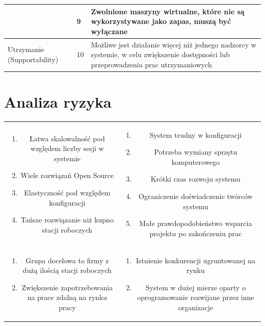 \documentclass[12pt]{article}
\begin{document}
\begin{center}
\begin{table}[h!]
\begin{tabular}{|p{}|p{}|p{}|}
			                                                & 9            & Zwolnione maszyny wirtualne, które nie są wykorzystywane jako zapas, muszą być wyłączane                                                                                \\ \hline
			\multirow[t]{3}{=}{Utrzymanie (Supportability)} & 10           & Możliwe jest działanie więcej niż jednego nadzorcy w systemie, w celu zwiększenie dostępności lub przeprowadzenia prac utrzymaniowych                                   \\
			\hline
		\end{tabular}
	\end{table}
\end{center}

\section{Analiza ryzyka}

\begin{center}
	\begin{tabular}{| c | c |}
		\cline{1-2}
		\parbox{.45\textwidth}
		{
			\begin{enumerate}
			\item Łatwa skalowalność pod względem liczby sesji w systemie
			\item Wiele rozwiązań Open Source
			\item Elastyczność pod względem konfiguracji
			\item Tańsze rozwiązanie niż kupno stacji roboczych
			\end{enumerate}
		} & \parbox{.45\textwidth}
		{
			\begin{enumerate}
				\item System trudny w konfiguracji
				\item Potrzeba wymiany sprzętu komputerowego
				\item Krótki czas rozwoju systemu
				\item Ograniczenie doświadczenie twórców systemu
				\item Małe prawdopodobieństwo wsparcia projektu po zakończeniu prac
			\end{enumerate}
		} \\ 
		\parbox{.45\textwidth}
		{
			\begin{enumerate}
				\item Grupa docelowa to firmy z dużą ilością stacji roboczych
				\item Zwiększenie zapotrzebowania na prace zdalną na rynku pracy
			\end{enumerate}
		} & \parbox{.45\textwidth}
		{
			\begin{enumerate}
				\item Istnienie konkurencji ugruntowanej na rynku
				\item System w dużej mierze oparty o oprogramowanie rozwijane przez inne organizacje
			\end{enumerate}
		} \\ 
	\end{tabular}
\end{center}
\end{document}
